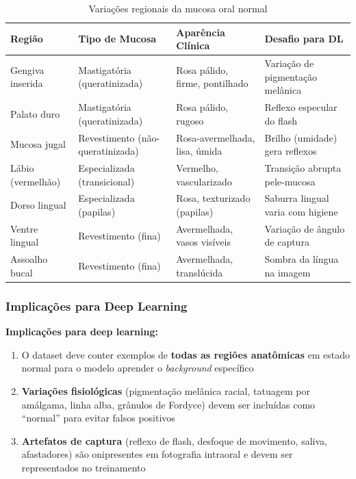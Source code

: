 \begin{table}[H]
  \centering
  \caption{Variações regionais da mucosa oral normal}
  \label{tab:mucosa-normal}
  \begin{tabularx}{\textwidth}{lllX}
    \toprule
    \textbf{Região} & \textbf{Tipo de Mucosa} & \textbf{Aparência Clínica} & \textbf{Desafio para DL} \\
    \midrule
    Gengiva inserida & Mastigatória (queratinizada) & Rosa pálido, firme, pontilhado & Variação de pigmentação melânica \\
    Palato duro & Mastigatória (queratinizada) & Rosa pálido, rugoso & Reflexo especular do flash \\
    Mucosa jugal & Revestimento (não-queratinizada) & Rosa-avermelhada, lisa, úmida & Brilho (umidade) gera reflexos \\
    Lábio (vermelhão) & Especializada (transicional) & Vermelho, vascularizado & Transição abrupta pele-mucosa \\
    Dorso lingual & Especializada (papilas) & Rosa, texturizado (papilas) & Saburra lingual varia com higiene \\
    Ventre lingual & Revestimento (fina) & Avermelhada, vasos visíveis & Variação de ângulo de captura \\
    Assoalho bucal & Revestimento (fina) & Avermelhada, translúcida & Sombra da língua na imagem \\
    \bottomrule
  \end{tabularx}
\end{table}

\subsubsection{Implicações para Deep Learning}

\textbf{Implicações para deep learning:}
\begin{enumerate}
  \item O dataset deve conter exemplos de \textbf{todas as regiões anatômicas}
        em estado normal para o modelo aprender o \textit{background} específico
  \item \textbf{Variações fisiológicas} (pigmentação melânica racial, tatuagem
        por amálgama, linha alba, grânulos de Fordyce) devem ser incluídas como
        ``normal'' para evitar falsos positivos
  \item \textbf{Artefatos de captura} (reflexo de flash, desfoque de movimento,
        saliva, afastadores) são onipresentes em fotografia intraoral e devem
        ser representados no treinamento
\end{enumerate}


